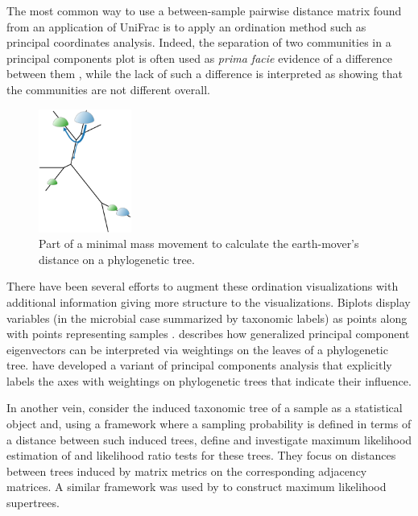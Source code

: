 \documentclass{amsart}
\newcommand{\forarxiv}[1]{#1}
\begin{document}
The most common way to use a between-sample pairwise distance matrix found from an application of UniFrac is to apply an ordination method such as principal coordinates analysis.
Indeed, the separation of two communities in a principal components plot is often used as \emph{prima facie} evidence of a difference between them
\citep[e.g.][]{lozupone2007global,costello2009bacterial,yatsunenko2012human}, while the lack of such a difference is interpreted as showing that the communities are not different overall.

\newcommand{\dirtpilesLegend}{
    Part of a minimal mass movement to calculate the earth-mover's distance on a phylogenetic tree.
}
\forarxiv{
\begin{figure}
  \vspace{-17pt}
  \begin{center}
    \includegraphics[width=1.2in]{figures/tree_dirtpiles.pdf}
  \end{center}
  \vspace{-5pt}
  \caption{\dirtpilesLegend}
  \label{fig:dirtpiles}
\end{figure}
}

There have been several efforts to augment these ordination visualizations with additional information giving more structure to the visualizations.
Biplots display variables (in the microbial case summarized by taxonomic labels) as points along with points representing samples \citep[e.g.][]{hewitt2013bacterial,lozupone2013meta}.
\citet{PurdomAnalyzingDataGraphs08} describes how generalized principal component eigenvectors can be interpreted via weightings on the leaves of a phylogenetic tree.
\citet{matsen2013edge} have developed a variant of principal components analysis that explicitly labels the axes with weightings on phylogenetic trees that indicate their influence.

In another vein, \citet{la2012statistical} consider the induced taxonomic tree of a sample as a statistical object and, using a framework where a sampling probability is defined in terms of a distance between such induced trees, define and investigate maximum likelihood estimation of and likelihood ratio tests for these trees.
They focus on distances between trees induced by matrix metrics on the corresponding adjacency matrices.
A similar framework was used by \citet{steel2008maximum} to construct maximum likelihood supertrees.
\end{document}
